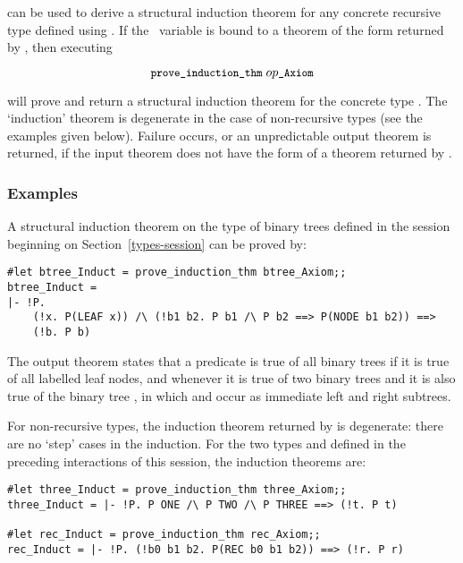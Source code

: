 \noindent can be used to derive a structural induction
theorem for any concrete
recursive type defined using .  If the \ML\
variable  is bound to a theorem of the form
returned by \ml{define\_type},
then executing

\[ \ml{prove\_induction\_thm}\;\ty{op}\ml{\_Axiom} \]

\noindent will prove  and  return a  structural induction  theorem for
the concrete type
.  The `induction' theorem is degenerate in the case of non-recursive
types (see the examples given below). Failure occurs, or an unpredictable
output theorem is returned, if the input theorem does not have the form
of a theorem  returned by \ml{define\_type}.

\subsubsection{Examples}

A structural induction theorem on the type of binary trees defined in the session
beginning on Section~\ref{types-session} can be proved by:

\begin{session}\begin{verbatim}
#let btree_Induct = prove_induction_thm btree_Axiom;;
btree_Induct =
|- !P.
    (!x. P(LEAF x)) /\ (!b1 b2. P b1 /\ P b2 ==> P(NODE b1 b2)) ==>
    (!b. P b)
\end{verbatim}\end{session}


\noindent The output theorem states that a predicate  is true of all
binary trees if it is true of all labelled leaf nodes, and whenever it is true
of two binary trees  and  it is also true of the binary tree
\ml{NODE b1 b2}, in which \ml{b1} and \ml{b2} occur as immediate left and right
subtrees.

For non-recursive types, the induction theorem returned by
 is degenerate: there are no `step' cases in the
induction.  For the two types \ml{three} and \ml{rec} defined in the preceding
interactions of this session, the induction theorems are:

\begin{session}\begin{verbatim}
#let three_Induct = prove_induction_thm three_Axiom;;
three_Induct = |- !P. P ONE /\ P TWO /\ P THREE ==> (!t. P t)

#let rec_Induct = prove_induction_thm rec_Axiom;;
rec_Induct = |- !P. (!b0 b1 b2. P(REC b0 b1 b2)) ==> (!r. P r)
\end{verbatim}\end{session}

